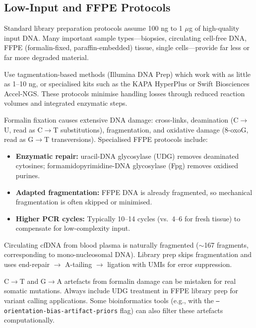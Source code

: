 \subsection{Low-Input and FFPE Protocols}
\label{subsec:libprep:low-input-ffpe}

Standard library preparation protocols assume 100 ng to 1 $\mu$g of high-quality input DNA. Many important sample types---biopsies, circulating cell-free DNA, FFPE (formalin-fixed, paraffin-embedded) tissue, single cells---provide far less or far more degraded material.

\begin{description}[style=nextline, itemsep=3pt]
  \item[Low-input protocols ($<$10 ng)] Use tagmentation-based methods (Illumina DNA Prep) which work with as little as 1--10 ng, or specialised kits such as the KAPA HyperPlus or Swift Biosciences Accel-NGS. These protocols minimise handling losses through reduced reaction volumes and integrated enzymatic steps.

  \item[FFPE samples] Formalin fixation causes extensive DNA damage: cross-links, deamination (C$\to$U, read as C$\to$T substitutions), fragmentation, and oxidative damage (8-oxoG, read as G$\to$T transversions). Specialised FFPE protocols include:
  \begin{itemize}[nosep]
    \item \textbf{Enzymatic repair:} uracil-DNA glycosylase (UDG) removes deaminated cytosines; formamidopyrimidine-DNA glycosylase (Fpg) removes oxidised purines.
    \item \textbf{Adapted fragmentation:} FFPE DNA is already fragmented, so mechanical fragmentation is often skipped or minimised.
    \item \textbf{Higher PCR cycles:} Typically 10--14 cycles (vs.\ 4--6 for fresh tissue) to compensate for low-complexity input.
  \end{itemize}

  \item[Cell-free DNA (cfDNA)] Circulating cfDNA from blood plasma is naturally fragmented ($\sim$167\basepair{} fragments, corresponding to mono-nucleosomal DNA). Library prep skips fragmentation and uses end-repair $\to$ A-tailing $\to$ ligation with UMIs for error suppression.
\end{description}

\begin{warningbox}[title={FFPE Artefacts}]
C$\to$T and G$\to$A artefacts from formalin damage can be mistaken for real somatic mutations. Always include UDG treatment in FFPE library prep for variant calling applications. Some bioinformatics tools (e.g.,  with the \texttt{--orientation-bias-artifact-priors} flag) can also filter these artefacts computationally.
\end{warningbox}


